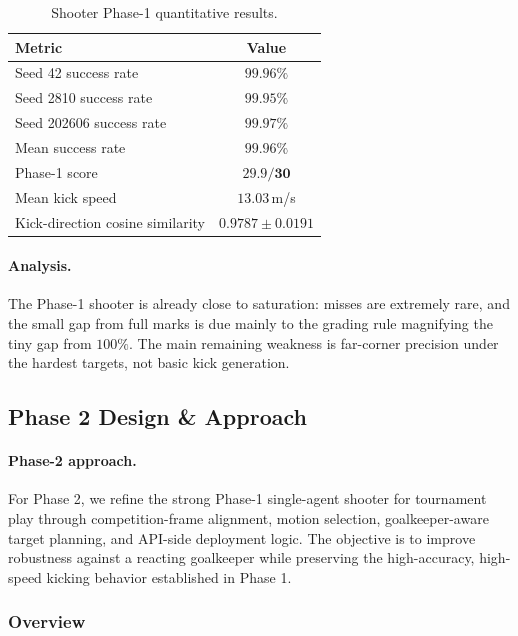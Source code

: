 \documentclass{article}
\begin{document}
\begin{table}[h]
\centering\small
\caption{Shooter Phase-1 quantitative results.}
\label{tab:sh-phase1-summary}
\begin{tabular}{@{}lc@{}}
\toprule
Metric & Value \\
\midrule
Seed 42 success rate & $99.96\%$ \\
Seed 2810 success rate & $99.95\%$ \\
Seed 202606 success rate & $99.97\%$ \\
Mean success rate & $\mathbf{99.96\%}$ \\
Phase-1 score & $\mathbf{29.9/30}$ \\
Mean kick speed & $13.03$\,m/s \\
Kick-direction cosine similarity & $0.9787 \pm 0.0191$ \\
\bottomrule
\end{tabular}
\end{table}

\paragraph{Analysis.} The Phase-1 shooter is already close to saturation:
misses are extremely rare, and the small gap from full marks is due mainly to
the grading rule magnifying the tiny gap from $100\%$. The main remaining
weakness is far-corner precision under the hardest targets, not basic kick
generation.

\subsection{Phase 2 Design \& Approach}

\paragraph{Phase-2 approach.} For Phase 2, we refine the strong Phase-1
single-agent shooter for tournament play through competition-frame alignment,
motion selection, goalkeeper-aware target planning, and API-side deployment
logic. The objective is to improve robustness against a reacting goalkeeper
while preserving the high-accuracy, high-speed kicking behavior established in
Phase 1.

\subsubsection{Overview}\label{sec:sh-overview}
\end{document}
